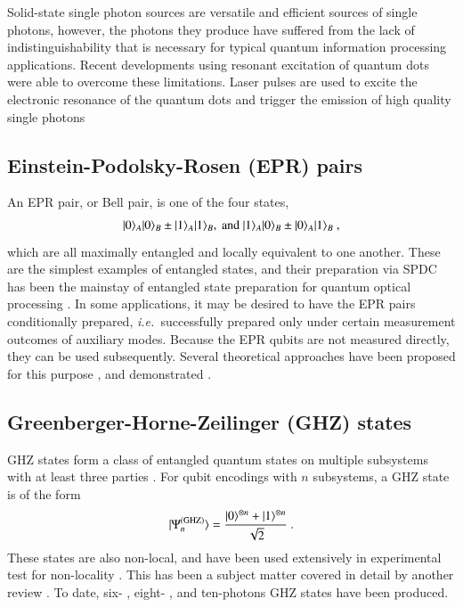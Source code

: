 \documentclass[times,final]{elsarticle}
\newcommand{\ket}[1]{|#1\rangle}
\begin{document}
Solid-state single photon sources are versatile and efficient sources of single photons, however, the photons they produce have suffered from the lack of indistinguishability that is necessary for typical quantum information processing applications. Recent developments using resonant excitation of quantum dots were able to overcome these limitations. Laser pulses are used to excite the electronic resonance of the quantum dots and trigger the emission of high quality single photons \cite{bib:WangHe16}

\subsection{Einstein-Podolsky-Rosen (EPR) pairs}

An EPR pair, or Bell pair, is one of the four states,
\begin{align}
\ket{0}_A\ket{0}_B \pm \ket{1}_A\ket{1}_B, \ {\rm and} \ \ket{1}_A\ket{0}_B \pm \ket{0}_A\ket{1}_B \ ,
\end{align}
which are all maximally entangled and locally equivalent to one another. These are the simplest examples of entangled states, and their preparation via SPDC has been the mainstay of entangled state preparation for quantum optical processing \cite{bib:Kim01}.
In some applications, it may be desired to have the EPR pairs conditionally prepared, {\it i.e.~}successfully prepared only under certain measurement outcomes of auxiliary modes. Because the EPR qubits are not measured directly, they can be used subsequently. Several theoretical approaches have been proposed for this purpose \cite{bib:Pittman03,bib:Sliwa03,bib:Walther07}, and demonstrated \cite{bib:Wagenknecht10,bib:Barz10}.

\subsection{Greenberger-Horne-Zeilinger (GHZ) states}

GHZ states form a class of entangled quantum states on multiple subsystems with at least three parties \cite{bib:GHZ89}. For qubit encodings with $n$ subsystems, a GHZ state is of the form
\begin{align}
\ket{\Psi_{n}^{\rm (GHZ)}}=\frac{\ket{0}^{\otimes n}+\ket{1}^{\otimes n}}{\sqrt{2}} \ .
\end{align}
These states are also non-local, and have been used extensively in experimental test for non-locality \cite{bib:JW00,bib:Zhang15}. This has been a subject matter covered in detail by another review \cite{bib:JW12}. To date, six- \cite{bib:Lu06,bib:Zhang15}, eight- \cite{bib:Huang11,bib:Yao12}, and ten-photons \cite{bib:WangChen16,bib:Chen17} GHZ states have been produced.
\end{document}
